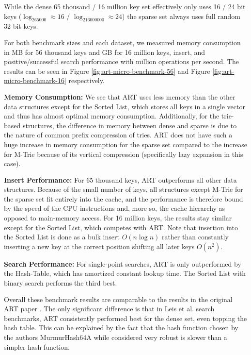 \documentclass[acmtog, nonacm]{acmart}
\begin{document}
While the dense 65 thousand / 16 million key set effectively only uses 16 / 24 bit keys ($\log_265000\approx16$ / $\log_216000000\approx24$)
the sparse set always uses full random 32 bit keys.

For both benchmark sizes and each dataset, we measured memory consumption in MB for 56 thousand keys and GB for 
16 million keys, insert, and positive/successful search performance with million operations per second. 
The results can be seen in Figure \ref{fig:art-micro-benchmark-56} and Figure \ref{fig:art-micro-benchmark-16} respectively.

\textbf{Memory Consumption:} We see that ART uses less memory than the other data structures except for the Sorted List, which stores all keys in a single vector and thus has almost optimal memory consumption. Additionally, for the 
trie-based structures, the difference in memory between dense and sparse is due to the nature of common prefix
compression of tries. ART does not have such a huge increase in memory consumption for the sparse set
compared to the increase for M-Trie because of its vertical compression (specifically lazy expansion in this case).

\textbf{Insert Performance:} For 65 thousand keys, ART outperforms all other data structures. 
Because of the small number of keys, all structures except M-Trie for the sparse set fit entirely into the cache, 
and the performance is therefore
bound by the speed of the CPU instructions and, more so, the cache hierarchy as opposed to main-memory access.
For 16 million keys, the results stay similar except for the Sorted List, which competes with ART. Note that 
insertion into the Sorted List is done as a bulk insert $O(n\log n)$ rather than constantly 
inserting a new key at the correct position shifting all later keys $O(n^2)$.

\textbf{Search Performance:} For single-point searches, ART is only outperformed by the Hash-Table, which has amortized
constant lookup time. The Sorted List with binary search performs the third best.

Overall these benchmark results are comparable to the results in the original ART paper \cite{6544812}. 
The only significant difference is that in Leis et al. search benchmarks, ART consistently performed best for the 
dense set, even topping the hash table. This can be explained by the fact that the hash function chosen by the authors 
MurmurHash64A \cite{murmur} while considered very robust is slower than a simpler hash function.
\end{document}

